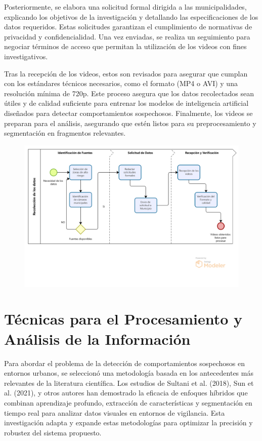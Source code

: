 Posteriormente, se elabora una solicitud formal dirigida a las municipalidades, explicando los objetivos de la investigación y detallando las especificaciones de los datos requeridos. Estas solicitudes garantizan el cumplimiento de normativas de privacidad y confidencialidad. Una vez enviadas, se realiza un seguimiento para negociar términos de acceso que permitan la utilización de los videos con fines investigativos.

Tras la recepción de los videos, estos son revisados para asegurar que cumplan con los estándares técnicos necesarios, como el formato (MP4 o AVI) y una resolución mínima de 720p. Este proceso asegura que los datos recolectados sean útiles y de calidad suficiente para entrenar los modelos de inteligencia artificial diseñados para detectar comportamientos sospechosos. Finalmente, los videos se preparan para el análisis, asegurando que estén listos para su preprocesamiento y segmentación en fragmentos relevantes.

\begin{figure}[h] %
    \centering
    \includegraphics[width=1.0\textwidth]{4/Flujograma data.png} %
    \label{fig:ejemplo} %
\end{figure}

\section{Técnicas para el Procesamiento y Análisis de la Información}
Para abordar el problema de la detección de comportamientos sospechosos en entornos urbanos, se seleccionó una metodología basada en los antecedentes más relevantes de la literatura científica. Los estudios de Sultani et al. (2018), Sun et al. (2021), y otros autores han demostrado la eficacia de enfoques híbridos que combinan aprendizaje profundo, extracción de características y segmentación en tiempo real para analizar datos visuales en entornos de vigilancia. Esta investigación adapta y expande estas metodologías para optimizar la precisión y robustez del sistema propuesto.


